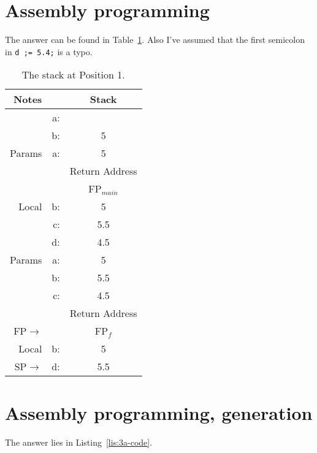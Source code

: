\section{Assembly programming}
The answer can be found in Table~\ref{tab:2a}.
Also I've assumed that the first semicolon in \texttt{d ;= 5.4;} is a typo.
\begin{table}[H]
\centering
\begin{tabular}{|r|r||c|}
	\hline
	Notes	& & Stack \\ \hline
			& a: & 		\\ \hline		
			& b: & 5	\\ \hline
	Params	& a: & 5	\\ \hline	
			& &Return Address  \\ \hline
			& &FP$_{main}$ \\ \hline
	Local	& b: & 5	\\ \hline
			& c: & 5.5	\\ \hline
			& d: & 4.5	\\ \hline
	Params	& a: & 5	\\ \hline
			& b: & 5.5	\\ \hline
			& c: & 4.5	\\ \hline
			& &Return Address \\ \hline
	FP$\rightarrow$& &FP$_f$ 	\\ \hline
	Local	& b: & 5	\\ \hline
	SP$\rightarrow$	& d: & 5.5	\\ \hline
\end{tabular}
\caption{The stack at Position 1.}
\label{tab:2a}
\end{table}


\newpage
\section{Assembly programming, generation}
The answer lies in Listing~\ref{lis:3a-code}.

